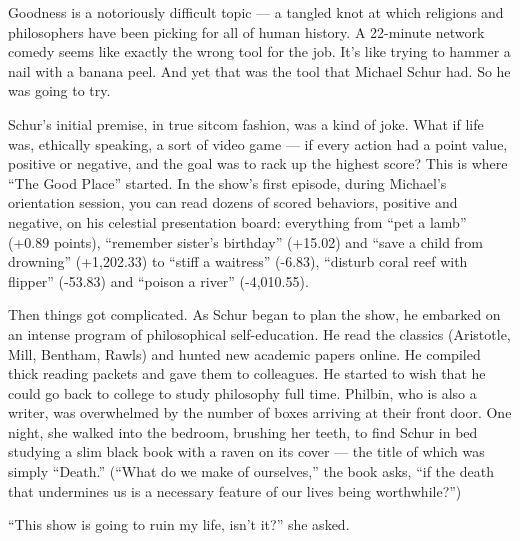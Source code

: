Goodness is a notoriously difficult topic --- a tangled knot at which
religions and philosophers have been picking for all of human history. A
22-minute network comedy seems like exactly the wrong tool for the job.
It's like trying to hammer a nail with a banana peel. And yet that was
the tool that Michael Schur had. So he was going to try.

Schur's initial premise, in true sitcom fashion, was a kind of joke.
What if life was, ethically speaking, a sort of video game --- if every
action had a point value, positive or negative, and the goal was to rack
up the highest score? This is where ``The Good Place'' started. In the
show's first episode, during Michael's orientation session, you can read
dozens of scored behaviors, positive and negative, on his celestial
presentation board: everything from ``pet a lamb'' (+0.89 points),
``remember sister's birthday'' (+15.02) and ``save a child from
drowning'' (+1,202.33) to ``stiff a waitress'' (-6.83), ``disturb coral
reef with flipper'' (-53.83) and ``poison a river'' (-4,010.55).

Then things got complicated. As Schur began to plan the show, he
embarked on an intense program of philosophical self-education. He read
the classics (Aristotle, Mill, Bentham, Rawls) and hunted new academic
papers online. He compiled thick reading packets and gave them to
colleagues. He started to wish that he could go back to college to study
philosophy full time. Philbin, who is also a writer, was overwhelmed by
the number of boxes arriving at their front door. One night, she walked
into the bedroom, brushing her teeth, to find Schur in bed studying a
slim black book with a raven on its cover --- the title of which was
simply ``Death.'' (``What do we make of ourselves,'' the book asks, ``if
the death that undermines us is a necessary feature of our lives being
worthwhile?'')

``This show is going to ruin my life, isn't it?'' she asked.

